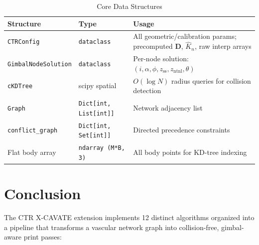 \documentclass[11pt,a4paper]{article}
\begin{document}
\begin{table}[H]
\centering
\caption{Core Data Structures}
\begin{tabular}{llp{5.5cm}}
\toprule
\textbf{Structure} & \textbf{Type} & \textbf{Usage} \\
\midrule
\texttt{CTRConfig} & \texttt{dataclass} & All geometric/calibration params; precomputed $\mathbf{D}$, $\hat{K}_n$, raw interp arrays \\
\texttt{GimbalNodeSolution} & \texttt{dataclass} & Per-node solution: $(i, \alpha, \phi, z_\text{ss}, z_\text{ntnl}, \theta)$ \\
\texttt{cKDTree} & scipy spatial & $O(\log N)$ radius queries for collision detection \\
\texttt{Graph} & \texttt{Dict[int, List[int]]} & Network adjacency list \\
\texttt{conflict\_graph} & \texttt{Dict[int, Set[int]]} & Directed precedence constraints \\
Flat body array & \texttt{ndarray (M*B, 3)} & All body points for KD-tree indexing \\
\bottomrule
\end{tabular}
\end{table}


\section{Conclusion}

The CTR X-CAVATE extension implements 12 distinct algorithms organized into a pipeline that transforms a vascular network graph into collision-free, gimbal-aware print passes:
\end{document}
